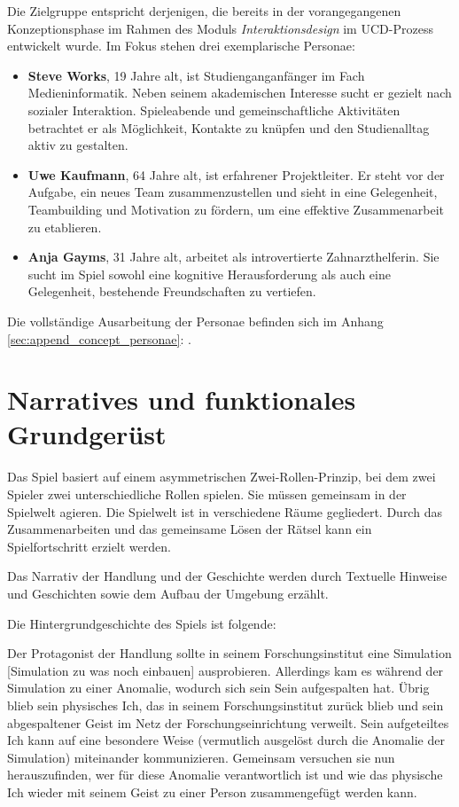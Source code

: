 Die Zielgruppe entspricht derjenigen, die bereits in der vorangegangenen Konzeptionsphase im Rahmen des Moduls \textit{Interaktionsdesign} im \ac{UCD}-Prozess entwickelt wurde. Im Fokus stehen drei exemplarische Personae:

\begin{itemize}
    \item \textbf{Steve Works}, 19 Jahre alt, ist Studienganganfänger im Fach Medieninformatik. Neben seinem akademischen Interesse sucht er gezielt nach sozialer Interaktion. Spieleabende und gemeinschaftliche Aktivitäten betrachtet er als Möglichkeit, Kontakte zu knüpfen und den Studienalltag aktiv zu gestalten.
    \item \textbf{Uwe Kaufmann}, 64 Jahre alt, ist erfahrener Projektleiter. Er steht vor der Aufgabe, ein neues Team zusammenzustellen und sieht in  eine Gelegenheit, Teambuilding und Motivation zu fördern, um eine effektive Zusammenarbeit zu etablieren.
    \item \textbf{Anja Gayms}, 31 Jahre alt, arbeitet als introvertierte Zahnarzthelferin. Sie sucht im Spiel sowohl eine kognitive Herausforderung als auch eine Gelegenheit, bestehende Freundschaften zu vertiefen.
\end{itemize}

Die vollständige Ausarbeitung der Personae befinden sich im Anhang \ref{sec:append_concept_personae}: .

\section{Narratives und funktionales Grundgerüst}

Das Spiel basiert auf einem asymmetrischen Zwei-Rollen-Prinzip, bei dem zwei Spieler zwei unterschiedliche Rollen spielen. Sie müssen gemeinsam in der Spielwelt agieren. Die Spielwelt ist in verschiedene Räume gegliedert. Durch das Zusammenarbeiten und das gemeinsame Lösen der Rätsel kann ein Spielfortschritt erzielt werden.

Das Narrativ der Handlung und der Geschichte werden durch Textuelle Hinweise und Geschichten sowie dem Aufbau der Umgebung erzählt. 

Die Hintergrundgeschichte des Spiels ist folgende:

Der Protagonist der Handlung sollte in seinem Forschungsinstitut eine Simulation [Simulation zu was noch einbauen] ausprobieren. Allerdings kam es während der Simulation zu einer Anomalie, wodurch sich sein Sein aufgespalten hat. Übrig blieb sein physisches Ich, das in seinem Forschungsinstitut zurück blieb und sein abgespaltener Geist im Netz der Forschungseinrichtung verweilt. Sein aufgeteiltes Ich kann auf eine besondere Weise (vermutlich ausgelöst durch die Anomalie der Simulation) miteinander kommunizieren. Gemeinsam versuchen sie nun herauszufinden, wer für diese Anomalie verantwortlich ist und wie das physische Ich wieder mit seinem Geist zu einer Person zusammengefügt werden kann.

